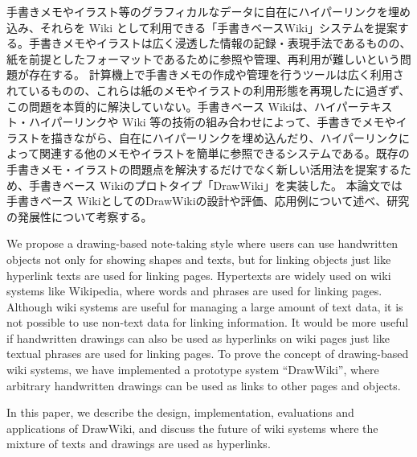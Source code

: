 \begin{jabstract}

 手書きメモやイラスト等のグラフィカルなデータに自在にハイパーリンクを埋め込み、それらを Wiki として利用できる「手書きベースWiki」システムを提案する。手書きメモやイラストは広く浸透した情報の記録・表現手法であるものの、紙を前提としたフォーマットであるために参照や管理、再利用が難しいという問題が存在する。
 計算機上で手書きメモの作成や管理を行うツールは広く利用されているものの、これらは紙のメモやイラストの利用形態を再現したに過ぎず、この問題を本質的に解決していない。手書きベース Wikiは、ハイパーテキスト・ハイパーリンクや Wiki 等の技術の組み合わせによって、手書きでメモやイラストを描きながら、自在にハイパーリンクを埋め込んだり、ハイパーリンクによって関連する他のメモやイラストを簡単に参照できるシステムである。既存の手書きメモ・イラストの問題点を解決するだけでなく新しい活用法を提案するため、手書きベース Wikiのプロトタイプ「DrawWiki」を実装した。
 本論文では手書きベース WikiとしてのDrawWikiの設計や評価、応用例について述べ、研究の発展性について考察する。

\end{jabstract}


\begin{eabstract}

 We propose a drawing-based note-taking style where users can use handwritten objects not only for showing shapes and texts,
 but for linking objects just like hyperlink texts are used for linking pages.
 Hypertexts are widely used on wiki systems like Wikipedia, where words and phrases are used for linking pages.
 Although wiki systems are useful for managing a large amount of text data, it is not possible to use non-text data for linking information.
 It would be more useful if handwritten drawings can also be used as hyperlinks on wiki pages just like textual phrases are used for linking pages.
 To prove the concept of drawing-based wiki systems, we have implemented a prototype system “DrawWiki”, where arbitrary handwritten drawings can be used as links to other pages and objects.

 In this paper, we describe the design, implementation, evaluations and applications of DrawWiki, and discuss the future of wiki systems where the mixture of texts and drawings are used as hyperlinks.


\end{eabstract}

